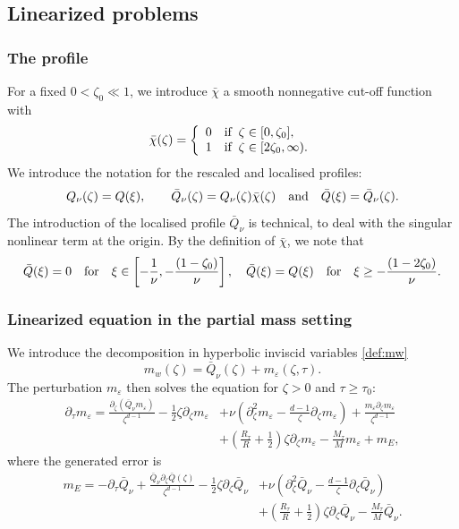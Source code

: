 \documentclass[11pt]{aims}
\theoremstyle{definition}
\newcommand{\ep}{\varepsilon}
\newcommand{\pa}{\partial}
\numberwithin{equation}{section}
\begin{document}
\subsection{Linearized problems}
\subsubsection{The profile} For a fixed $0 < \zeta_0 \ll 1$, we introduce $\bar \chi$ a smooth nonnegative cut-off function with
\begin{equation}\label{def:barchi}
\bar \chi(\zeta) = \left\{ \begin{array}{ll}0 & \textup{if}\;\; \zeta \in [0, \zeta_0],\\
1 & \textup{if}\;\; \zeta \in [2\zeta_0, \infty).
\end{array} \right.
\end{equation} 
We introduce the notation for the rescaled and localised profiles:
\begin{equation}\label{def:Qbar}
 Q_\nu(\zeta) = Q(\xi), \quad \quad \bar Q_\nu(\zeta)= Q_\nu(\zeta) \bar \chi(\zeta) \quad \textup{and} \quad \bar Q(\xi) = \bar Q_\nu(\zeta).
\end{equation} 
The introduction of the localised profile $\bar Q_\nu$ is technical, to deal with the singular nonlinear term at the origin. By the definition of $\bar \chi$, we note that 
\begin{equation*}
\bar Q(\xi) = 0 \quad \textup{for}\quad \xi \in \left[-\frac{1}{\nu}, -\frac{(1 - \zeta_0)}{\nu}\right], \quad \bar Q(\xi) = Q(\xi) \quad \textup{for} \quad \xi \geq -\frac{(1 - 2\zeta_ 0)}{\nu}.
\end{equation*}


 \subsubsection{Linearized equation in the partial mass setting} We introduce the decomposition in hyperbolic inviscid variables \eqref{def:mw}
\begin{equation}\label{def:mepmq}
m_w(\zeta) =   \bar Q_\nu(\zeta)+m_\ep(\zeta, \tau).
\end{equation}
The perturbation $m_\ep$ then solves the equation for $\zeta > 0$ and $\tau \geq \tau_0$:
\begin{align}
\pa_\tau m_\ep = \frac{\pa_\zeta(\bar Q_\nu m_\ep) }{\zeta^{d-1}} - \frac{1}{2}\zeta \pa_\zeta m_\ep &+\nu \left( \pa_\zeta^2 m_\ep - \frac{d-1}{\zeta} \pa_\zeta m_\ep\right) + \frac{m_\ep \pa_\zeta m_\ep}{\zeta^{d-1}} \nonumber\\
& + \left(\frac{R_\tau}{R} + \frac{1}{2} \right)\zeta \pa_\zeta m_\ep - \frac{M_\tau}{M}  m_\ep + m_E, \label{eq:mep0}
\end{align}
where the generated error is
\begin{align}
m_E = -\pa_\tau \bar Q_\nu + \frac{\bar Q_\nu \pa_\zeta \bar Q(\zeta)}{\zeta^{d-1}} - \frac{1}{2}\zeta \pa_\zeta \bar Q_\nu &+ \nu \left(\pa_\zeta^2 \bar Q_\nu - \frac{d-1}{\zeta}\pa_\zeta \bar Q_\nu \right) \nonumber\\
& +\left(\frac{R_\tau}{R} + \frac{1}{2} \right) \zeta \pa_\zeta \bar Q_\nu - \frac{M_\tau}{M}\bar Q_\nu. \label{def:mE0}
\end{align}
\end{document}
